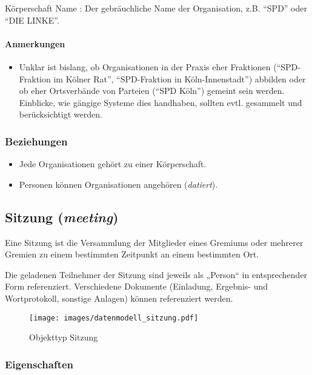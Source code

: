 \documentclass[,a4paper]{article}
\makeatletter
\def\maxwidth{\ifdim\Gin@nat@width>\linewidth\linewidth
\else\Gin@nat@width\fi}
\let\Oldincludegraphics\includegraphics
\renewcommand{\includegraphics}[1]{\Oldincludegraphics[width=\maxwidth]{#1}}
\makeatother
\begin{document}
Körperschaft Name : Der gebräuchliche Name der Organisation, z.B.
``SPD'' oder ``DIE LINKE''.

\paragraph{Anmerkungen}

\begin{itemize}
\item
  Unklar ist bislang, ob Organisationen in der Praxis eher Fraktionen
  (``SPD-Fraktion im Kölner Rat'', ``SPD-Fraktion in Köln-Innenstadt'')
  abbilden oder ob eher Ortsverbände von Parteien (``SPD Köln'') gemeint
  sein werden. Einblicke, wie gängige Systeme dies handhaben, sollten
  evtl. gesammelt und berücksichtigt werden.
\end{itemize}

\subsubsection{Beziehungen}

\begin{itemize}
\item
  Jede Organisationen gehört zu einer Körperschaft.
\item
  Personen können Organisationen angehören (\emph{datiert}).
\end{itemize}

\subsection{Sitzung (\emph{meeting})}

Eine Sitzung ist die Versammlung der Mitglieder eines Gremiums oder
mehrerer Gremien zu einem bestimmten Zeitpunkt an einem bestimmten Ort.

Die geladenen Teilnehmer der Sitzung sind jeweils als „Person`` in
entsprechender Form referenziert. Verschiedene Dokumente (Einladung,
Ergebnis- und Wortprotokoll, sonstige Anlagen) können referenziert
werden.

\begin{figure}[htbp]
\centering
\texttt{[image: images/datenmodell\_sitzung.pdf]}
\caption{Objekttyp Sitzung}
\end{figure}

\subsubsection{Eigenschaften}
\end{document}
